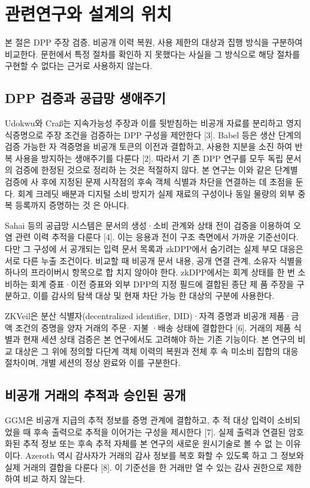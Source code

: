 \section{관련연구와 설계의 위치}
본 절은 DPP 주장 검증, 비공개 이력 복원, 사용 제한의 대상과
집행 방식을 구분하여 비교한다. 문헌에서 특정 절차를 확인하
지 못했다는 사실을 그 방식으로 해당 절차를 구현할 수 없다는
근거로 사용하지 않는다.

\subsection{DPP 검증과 공급망 생애주기}
Udokwu와 Craß는 지속가능성 주장과 이를 뒷받침하는 비공개
자료를 분리하고 영지식증명으로 주장 조건을 검증하는 DPP
구성을 제안한다 [3]. Babel 등은 생산 단계의 검증 가능한 자
격증명을 비공개 토큰의 이전과 결합하고, 사용한 지분을 소진
하여 반복 사용을 방지하는 생애주기를 다룬다 [2]. 따라서 기
존 DPP 연구를 모두 독립 문서의 검증에 한정된 것으로 정리하
는 것은 적절하지 않다. 본 연구는 이와 같은 단계별 검증에 사
후에 지정된 문제 시작점의 후속 객체 식별과 차단을 연결하는
데 초점을 둔다. 회계 크레딧 배분과 디지털 소비 방지가 실제
재료의 구성이나 동일 물량의 외부 중복 등록까지 증명하는 것
은 아니다.

Sahai 등의 공급망 시스템은 문서의 생성·소비 관계와 상태
전이 검증을 이용하여 오염 관련 이력 추적을 다룬다 [4]. 이는
응용과 전이 구조 측면에서 가까운 기준선이다. 다만 그 구성에
서 공개되는 입력 문서 목록과 zkDPP에서 숨기려는 실제 부모
대응은 서로 다른 누출 조건이다. 비교할 때 비공개 문서 내용,
공개 연결 관계, 소유자 식별을 하나의 프라이버시 항목으로 합
치지 않아야 한다. zkDPP에서는 회계 상태를 한 번 소비하는
회계 증표·이전 증표와 외부 DPP의 지정 필드에 결합된 종단 제
품 주장을 구분하고, 이를 감사의 탐색 대상 및 현재 차단 가능
한 대상의 구분에 사용한다.

ZKVeil은 분산 식별자(decentralized identifier, DID)·자격
증명과 비공개 제품·금액 조건의 증명을 양자 거래의 주문·지불
·배송 상태에 결합한다 [6]. 거래의 제품 식별과 현재 세션 상태
검증은 본 연구에서도 고려해야 하는 기존 기능이다. 본 연구의
비교 대상은 그 위에 정의할 다단계 객체 이력의 복원과 전체 후
속 미소비 집합의 대응 절차이며, 개별 세션의 정상 완료와 이를
구분한다.

\subsection{비공개 거래의 추적과 승인된 공개}
GGM은 비공개 지급의 추적 정보를 증명 관계에 결합하고, 추
적 대상 입력이 소비되었을 때 후속 출력으로 추적을 이어가는
구성을 제시한다 [7]. 실제 출력과 연결된 암호화된 추적 정보
또는 후속 추적 자체를 본 연구의 새로운 원시기술로 볼 수 없
는 이유이다. Azeroth 역시 감사자가 거래의 감사 정보를 복호
화할 수 있도록 하고 그 정보와 실제 거래의 결합을 다룬다 [8].
이 기준선을 한 거래만 열 수 있는 감사 권한으로 제한하여 비교
하지 않는다.

